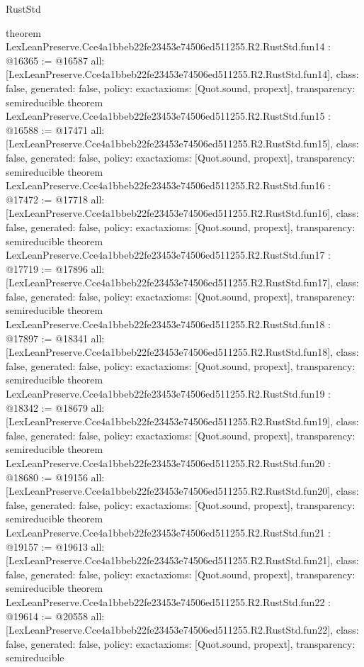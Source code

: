 \begin{lexlean}{RustStd}
\begin{coremodule}
{}
theorem LexLeanPreserve.Cce4a1bbeb22fe23453e74506ed511255.R2.RustStd.fun14 : @16365 := @16587 {
  all: [LexLeanPreserve.Cce4a1bbeb22fe23453e74506ed511255.R2.RustStd.fun14],
  class: false,
  generated: false,
  policy: exact{axioms: [Quot.sound, propext]},
  transparency: semireducible
}
theorem LexLeanPreserve.Cce4a1bbeb22fe23453e74506ed511255.R2.RustStd.fun15 : @16588 := @17471 {
  all: [LexLeanPreserve.Cce4a1bbeb22fe23453e74506ed511255.R2.RustStd.fun15],
  class: false,
  generated: false,
  policy: exact{axioms: [Quot.sound, propext]},
  transparency: semireducible
}
theorem LexLeanPreserve.Cce4a1bbeb22fe23453e74506ed511255.R2.RustStd.fun16 : @17472 := @17718 {
  all: [LexLeanPreserve.Cce4a1bbeb22fe23453e74506ed511255.R2.RustStd.fun16],
  class: false,
  generated: false,
  policy: exact{axioms: [Quot.sound, propext]},
  transparency: semireducible
}
theorem LexLeanPreserve.Cce4a1bbeb22fe23453e74506ed511255.R2.RustStd.fun17 : @17719 := @17896 {
  all: [LexLeanPreserve.Cce4a1bbeb22fe23453e74506ed511255.R2.RustStd.fun17],
  class: false,
  generated: false,
  policy: exact{axioms: [Quot.sound, propext]},
  transparency: semireducible
}
theorem LexLeanPreserve.Cce4a1bbeb22fe23453e74506ed511255.R2.RustStd.fun18 : @17897 := @18341 {
  all: [LexLeanPreserve.Cce4a1bbeb22fe23453e74506ed511255.R2.RustStd.fun18],
  class: false,
  generated: false,
  policy: exact{axioms: [Quot.sound, propext]},
  transparency: semireducible
}
theorem LexLeanPreserve.Cce4a1bbeb22fe23453e74506ed511255.R2.RustStd.fun19 : @18342 := @18679 {
  all: [LexLeanPreserve.Cce4a1bbeb22fe23453e74506ed511255.R2.RustStd.fun19],
  class: false,
  generated: false,
  policy: exact{axioms: [Quot.sound, propext]},
  transparency: semireducible
}
theorem LexLeanPreserve.Cce4a1bbeb22fe23453e74506ed511255.R2.RustStd.fun20 : @18680 := @19156 {
  all: [LexLeanPreserve.Cce4a1bbeb22fe23453e74506ed511255.R2.RustStd.fun20],
  class: false,
  generated: false,
  policy: exact{axioms: [Quot.sound, propext]},
  transparency: semireducible
}
theorem LexLeanPreserve.Cce4a1bbeb22fe23453e74506ed511255.R2.RustStd.fun21 : @19157 := @19613 {
  all: [LexLeanPreserve.Cce4a1bbeb22fe23453e74506ed511255.R2.RustStd.fun21],
  class: false,
  generated: false,
  policy: exact{axioms: [Quot.sound, propext]},
  transparency: semireducible
}
theorem LexLeanPreserve.Cce4a1bbeb22fe23453e74506ed511255.R2.RustStd.fun22 : @19614 := @20558 {
  all: [LexLeanPreserve.Cce4a1bbeb22fe23453e74506ed511255.R2.RustStd.fun22],
  class: false,
  generated: false,
  policy: exact{axioms: [Quot.sound, propext]},
  transparency: semireducible
}
\end{coremodule}
\end{lexlean}
